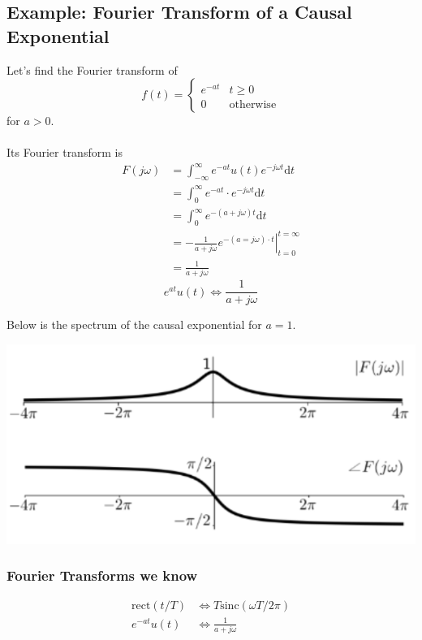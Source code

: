 \documentclass[10pt]{article}
\newcommand{\sinc}{\text{sinc}}
\begin{document}
\subsection*{Example: Fourier Transform of a Causal Exponential}
Let's find the Fourier transform of
\[f(t) = \begin{cases}e^{-at} & t \geq 0 \\ 0 & \text{otherwise}\end{cases}\]
for $a > 0$.\\\\
Its Fourier transform is 
\begin{align*}
    F(j\omega) &= \int_{-\infty}^\infty e^{-at} u(t) e^{-j\omega t} \text{d}t\\
    &= \int_0^\infty e^{-at} \cdot e^{-j\omega t} \text{d}t\\
    &= \int_0^\infty e^{-(a + j\omega)t} \text{d}t\\
    &= \left.-\frac{1}{a + j\omega} e^{-(a = j\omega) \cdot t}\right|_{t = 0}^{t = \infty}\\
    &= \frac{1}{a + j\omega}
\end{align*}
\[e^{at}u(t) \Longleftrightarrow \frac{1}{a + j\omega}\]

Below is the spectrum of the causal exponential for $a = 1$.
\begin{center}
    \includegraphics[scale=0.8]{W5_3.png}
\end{center}

\subsubsection*{Fourier Transforms we know}
\begin{align*}
    \text{rect}(t/T) &\Longleftrightarrow T \sinc(\omega T / 2\pi)\\
    e^{-at} u(t) &\Longleftrightarrow \frac{1}{a + j\omega}
\end{align*}
\end{document}

